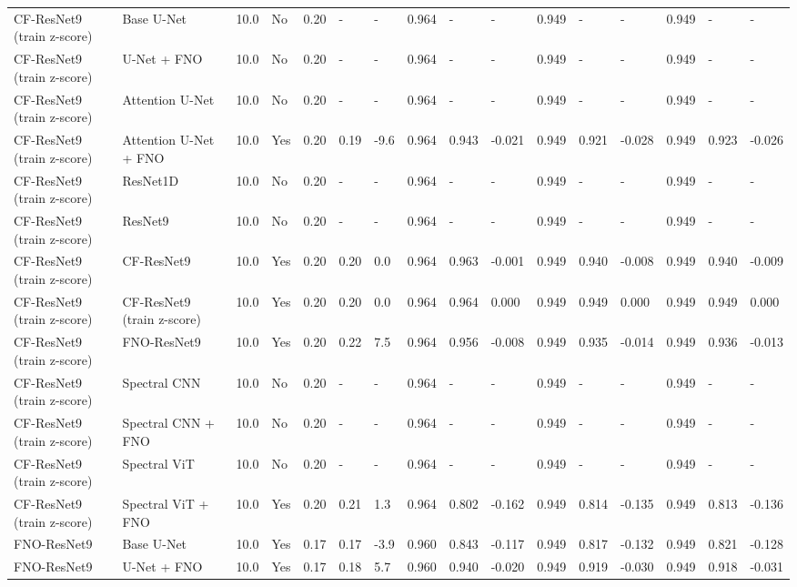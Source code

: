\begin{longtable}{llllllllllllllll}
CF-ResNet9 (train z-score) & Base U-Net & 10.0 & No & 0.20 & - & - & 0.964 & - & - & 0.949 & - & - & 0.949 & - & - \\
CF-ResNet9 (train z-score) & U-Net + FNO & 10.0 & No & 0.20 & - & - & 0.964 & - & - & 0.949 & - & - & 0.949 & - & - \\
CF-ResNet9 (train z-score) & Attention U-Net & 10.0 & No & 0.20 & - & - & 0.964 & - & - & 0.949 & - & - & 0.949 & - & - \\
CF-ResNet9 (train z-score) & Attention U-Net + FNO & 10.0 & Yes & 0.20 & 0.19 & -9.6 & 0.964 & 0.943 & -0.021 & 0.949 & 0.921 & -0.028 & 0.949 & 0.923 & -0.026 \\
CF-ResNet9 (train z-score) & ResNet1D & 10.0 & No & 0.20 & - & - & 0.964 & - & - & 0.949 & - & - & 0.949 & - & - \\
CF-ResNet9 (train z-score) & ResNet9 & 10.0 & No & 0.20 & - & - & 0.964 & - & - & 0.949 & - & - & 0.949 & - & - \\
CF-ResNet9 (train z-score) & CF-ResNet9 & 10.0 & Yes & 0.20 & 0.20 & 0.0 & 0.964 & 0.963 & -0.001 & 0.949 & 0.940 & -0.008 & 0.949 & 0.940 & -0.009 \\
CF-ResNet9 (train z-score) & CF-ResNet9 (train z-score) & 10.0 & Yes & 0.20 & 0.20 & 0.0 & 0.964 & 0.964 & 0.000 & 0.949 & 0.949 & 0.000 & 0.949 & 0.949 & 0.000 \\
CF-ResNet9 (train z-score) & FNO-ResNet9 & 10.0 & Yes & 0.20 & 0.22 & 7.5 & 0.964 & 0.956 & -0.008 & 0.949 & 0.935 & -0.014 & 0.949 & 0.936 & -0.013 \\
CF-ResNet9 (train z-score) & Spectral CNN & 10.0 & No & 0.20 & - & - & 0.964 & - & - & 0.949 & - & - & 0.949 & - & - \\
CF-ResNet9 (train z-score) & Spectral CNN + FNO & 10.0 & No & 0.20 & - & - & 0.964 & - & - & 0.949 & - & - & 0.949 & - & - \\
CF-ResNet9 (train z-score) & Spectral ViT & 10.0 & No & 0.20 & - & - & 0.964 & - & - & 0.949 & - & - & 0.949 & - & - \\
CF-ResNet9 (train z-score) & Spectral ViT + FNO & 10.0 & Yes & 0.20 & 0.21 & 1.3 & 0.964 & 0.802 & -0.162 & 0.949 & 0.814 & -0.135 & 0.949 & 0.813 & -0.136 \\
FNO-ResNet9 & Base U-Net & 10.0 & Yes & 0.17 & 0.17 & -3.9 & 0.960 & 0.843 & -0.117 & 0.949 & 0.817 & -0.132 & 0.949 & 0.821 & -0.128 \\
FNO-ResNet9 & U-Net + FNO & 10.0 & Yes & 0.17 & 0.18 & 5.7 & 0.960 & 0.940 & -0.020 & 0.949 & 0.919 & -0.030 & 0.949 & 0.918 & -0.031 \\

\end{longtable}
